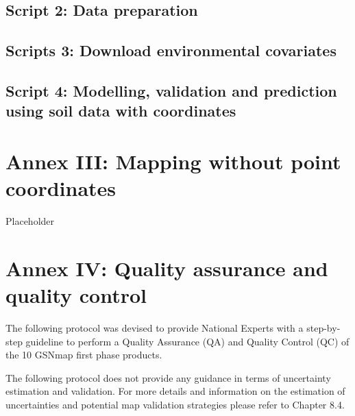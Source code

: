 \documentclass[
  10pt,
  b5paper,
  oneside]{book}
\begin{document}
\hypertarget{script-2-data-preparation}{%
\section*{Script 2: Data preparation}\label{script-2-data-preparation}}

\hypertarget{scripts-3-download-environmental-covariates}{%
\section*{Scripts 3: Download environmental covariates}\label{scripts-3-download-environmental-covariates}}

\hypertarget{script-4-modelling-validation-and-prediction-using-soil-data-with-coordinates}{%
\section*{Script 4: Modelling, validation and prediction using soil data with coordinates}\label{script-4-modelling-validation-and-prediction-using-soil-data-with-coordinates}}

\hypertarget{annex-iii-mapping-without-point-coordinates}{%
\chapter*{Annex III: Mapping without point coordinates}\label{annex-iii-mapping-without-point-coordinates}}

Placeholder

\hypertarget{annex-iv-quality-assurance-and-quality-control}{%
\chapter*{Annex IV: Quality assurance and quality control}\label{annex-iv-quality-assurance-and-quality-control}}

The following protocol was devised to provide National Experts with a step-by-step guideline to perform a Quality Assurance (QA) and Quality Control (QC) of the 10 GSNmap first phase products.

The following protocol does not provide any guidance in terms of uncertainty estimation and validation. For more details and information on the estimation of uncertainties and potential map validation strategies please refer to Chapter 8.4.
\end{document}
